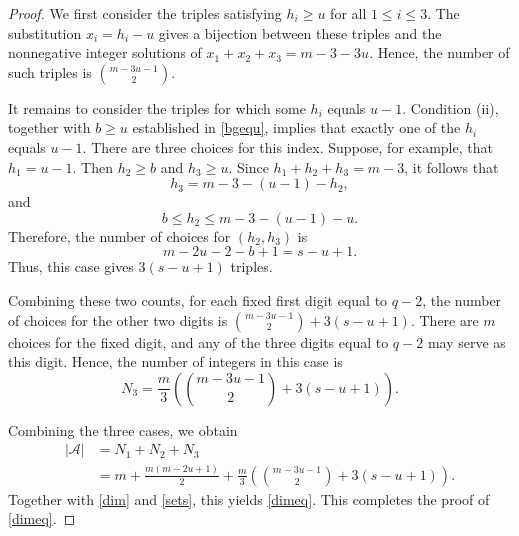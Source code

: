 \documentclass[journal,onecolumn]{IEEEtran}
\begin{document}
\begin{proof}
We first consider the triples satisfying $h_i\geq u$ for all
$1\leq i\leq3$. The substitution $x_i=h_i-u$ gives a bijection between
these triples and the nonnegative integer solutions of
$x_1+x_2+x_3=m-3-3u$. Hence,  the number of
such triples is
$
\binom{m-3u-1}{2}.
$ 


It remains to consider the triples for which some $h_i$ equals $u-1$.
Condition (ii), together with $b\geq u$ established in  \eqref{bgequ}, implies that exactly one
of the $h_i$ equals $u-1$. There are three choices for this index.
Suppose, for example, that $h_1=u-1$. Then $h_2\geq b$ and  $h_3\geq u$. Since $h_1+h_2+h_3=m-3$, it follows that  
\begin{equation*}
    h_3=m-3-(u-1)-h_2,
\end{equation*}
and 
\begin{equation*}
b\leq h_2\leq m-3-(u-1)-u.
\end{equation*}
Therefore, the number of choices for
$(h_2,h_3)$ is
\begin{equation*}
m-2u-2-b+1=s-u+1.
\end{equation*}
Thus, this case gives $3(s-u+1)$ triples.

Combining these two counts, for each fixed first digit equal to $q-2$,
the number of choices for the other two digits is
$\binom{m-3u-1}{2}+3(s-u+1)$. There are $m$ choices for the fixed
digit, and any of the three digits equal to $q-2$ may serve as this
digit. Hence, the number of integers in this case is
\begin{equation*}
N_3
=
\frac{m}{3}
\left(
\binom{m-3u-1}{2}+3(s-u+1)
\right).
\end{equation*}



Combining the three cases, we obtain
\begin{equation*}
\begin{aligned}
|\mathcal{A}|
&=N_1+N_2+N_3\\
&=
m+\frac{m(m-2u+1)}{2}
+\frac{m}{3}
\left(
\binom{m-3u-1}{2}+3(s-u+1)
\right).
\end{aligned}
\end{equation*}
Together with \eqref{dim} and \eqref{sets}, this yields \eqref{dimeq}. This completes the proof of \eqref{dimeq}.
\end{proof}
\end{document}
